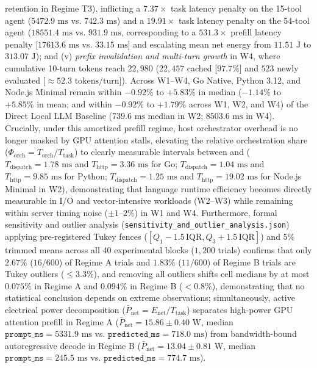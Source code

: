 \documentclass[11pt,a4paper]{article}
\begin{document}
\begin{itemize}
retention in Regime T3), inflicting a $7.37\times$ task latency penalty on the 15-tool agent ($5472.9\text{ ms}$ vs. $742.3\text{ ms}$) and a $19.91\times$ task latency penalty on the 54-tool agent ($18551.4\text{ ms}$ vs. $931.9\text{ ms}$, corresponding to a $531.3\times$ prefill latency penalty [$17613.6\text{ ms}$ vs. $33.15\text{ ms}$] and escalating mean net energy from $11.51\text{ J}$ to $313.07\text{ J}$); and (v) \textit{prefix invalidation and multi-turn growth} in W4, where cumulative 10-turn tokens reach $22{,}980$ ($22{,}457$ cached [$97.7\%$] and $523$ newly evaluated [$\approx 52.3\text{ tokens/turn}$]). Across W1--W4, Go Native, Python 3.12, and Node.js Minimal remain within $-0.92\%$ to $+5.83\%$ in median ($-1.14\%$ to $+5.85\%$ in mean; and within $-0.92\%$ to $+1.79\%$ across W1, W2, and W4) of the Direct Local LLM Baseline ($739.6\text{ ms}$ median in W2; $8503.6\text{ ms}$ in W4). Crucially, under this amortized prefill regime, host orchestrator overhead is no longer masked by GPU attention stalls, elevating the relative orchestration share ($\Phi_{\text{orch}} = T_{\text{orch}} / T_{\text{task}}$) to clearly measurable intervals between \PhiOrchFifteenMin{} and \PhiOrchFifteenMax{} ($T_{\text{dispatch}} = 1.78\text{ ms}$ and $T_{\text{http}} = 3.36\text{ ms}$ for Go; $T_{\text{dispatch}} = 1.04\text{ ms}$ and $T_{\text{http}} = 9.85\text{ ms}$ for Python; $T_{\text{dispatch}} = 1.25\text{ ms}$ and $T_{\text{http}} = 19.02\text{ ms}$ for Node.js Minimal in W2), demonstrating that language runtime efficiency becomes directly measurable in I/O and vector-intensive workloads (W2--W3) while remaining within server timing noise ($\pm 1\text{--}2\%$) in W1 and W4. Furthermore, formal sensitivity and outlier analysis (\texttt{sensitivity\_and\_outlier\_analysis.json}) applying pre-registered Tukey fences ($[Q_1 - 1.5\,\text{IQR}, Q_3 + 1.5\,\text{IQR}]$) and $5\%$ trimmed means across all 40 experimental blocks ($1{,}200$ trials) confirms that only $2.67\%$ ($16/600$) of Regime A trials and $1.83\%$ ($11/600$) of Regime B trials are Tukey outliers ($\le 3.3\%$), and removing all outliers shifts cell medians by at most $0.075\%$ in Regime A and $0.094\%$ in Regime B ($< 0.8\%$), demonstrating that no statistical conclusion depends on extreme observations; simultaneously, active electrical power decomposition ($\bar{P}_{\text{net}} = E_{\text{net}} / T_{\text{task}}$) separates high-power GPU attention prefill in Regime A ($\bar{P}_{\text{net}} = 15.86 \pm 0.40\text{ W}$, median $\texttt{prompt\_ms} = 5331.9\text{ ms}$ vs. $\texttt{predicted\_ms} = 718.0\text{ ms}$) from bandwidth-bound autoregressive decode in Regime B ($\bar{P}_{\text{net}} = 13.04 \pm 0.81\text{ W}$, median $\texttt{prompt\_ms} = 245.5\text{ ms}$ vs. $\texttt{predicted\_ms} = 774.7\text{ ms}$).
\end{itemize}
\end{document}

